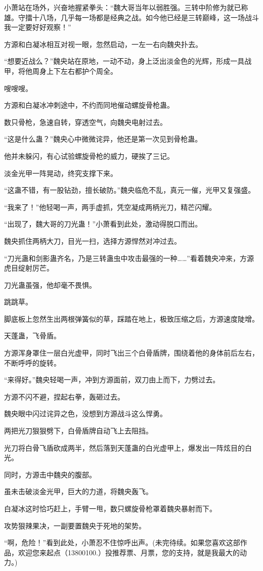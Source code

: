 \begin{this_body}
小萧站在场外，兴奋地握紧拳头：“魏大哥当年以弱胜强。三转中阶修为就已称雄。守擂十八场，几乎每一场都是经典之战。如今他已经是三转巅峰，这一场战斗我一定要好好观察！”

方源和白凝冰相互对视一眼，忽然启动，一左一右向魏央扑去。

“想要近战么？”魏央站在原地，一动不动，身上泛出淡金色的光辉，形成一具战甲，将他周身上下左右都护个周全。

嗖嗖嗖。

方源和白凝冰冲刺途中，不约而同地催动螺旋骨枪蛊。

数只骨枪，急速自转，穿透空气，向魏央电射过去。

“这是什么蛊？”魏央心中微微诧异，他还是第一次见到骨枪蛊。

他并未躲闪，有心试验螺旋骨枪的威力，硬挨了三记。

淡金光甲一阵晃动，终究支撑下来。

“这蛊不错，有一股钻劲，擅长破防。”魏央临危不乱，真元一催，光甲又复强盛。

“我来了！”他轻喝一声，两手虚抓，凭空凝成两柄光刀，精芒闪耀。

“出现了，魏大哥的刀光蛊！”小萧看到此处，激动得脱口而出。

魏央抓住两柄大刀，目光一扫，选择方源悍然对冲过去。

“刀光蛊和剑影蛊齐名，乃是三转蛊虫中攻击最强的一种……”看着魏央冲来，方源虎目绽射厉芒。

刀光蛊虽强，他却毫不畏惧。

跳跳草。

脚底板上忽然生出两根弹簧似的草，踩踏在地上，极致压缩之后，方源速度陡增。

天蓬蛊，飞骨盾。

方源浑身罩住一层白光虚甲，同时飞出三个白骨盾牌，围绕着他的身体前后左右，不断呼呼的旋转。

“来得好。”魏央轻喝一声，冲到方源面前，双刀由上而下，力劈过去。

方源不闪不避，捏起右拳，轰砸过去。

魏央眼中闪过诧异之色，没想到方源战斗这么悍勇。

两把光刀狠狠劈下，白骨盾牌自动飞上去阻挡。

光刀将白骨飞盾砍成两半，然后落到天蓬蛊的白光虚甲上，爆发出一阵炫目的白光。

同时，方源击中魏央的腹部。

虽未击破淡金光甲，巨大的力道，将魏央轰飞。

白凝冰这时恰巧赶上，手臂一甩，数只螺旋骨枪罩着魏央暴射而下。

攻势狠辣果决，一副要置魏央于死地的架势。

“啊，危险！”看到此处，小萧忍不住惊呼出声。(未完待续。如果您喜欢这部作品，欢迎您来起点（13800100.）投推荐票、月票，您的支持，就是我最大的动力。)

\end{this_body}

